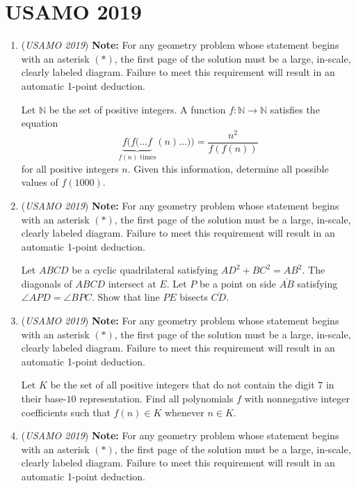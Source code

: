 \section{USAMO 2019}
        \begin{enumerate}
        	\item (\textit{USAMO 2019}) \textbf{Note:} For any geometry problem whose statement begins with an asterisk $(*)$, the first page of the solution must be a large, in-scale, clearly labeled diagram. Failure to meet this requirement will result in an automatic 1-point deduction.


 Let $\mathbb{N}$ be the set of positive integers. A function $f:\mathbb{N}\to\mathbb{N}$ satisfies the equation 
 \[\underbrace{f(f(\ldots f}_{f(n)\text{ times}}(n)\ldots))=\frac{n^2}{f(f(n))}\]for all positive integers $n$. Given this information, determine all possible values of $f(1000)$.


 

	\item (\textit{USAMO 2019}) \textbf{Note:} For any geometry problem whose statement begins with an asterisk $(*)$, the first page of the solution must be a large, in-scale, clearly labeled diagram. Failure to meet this requirement will result in an automatic 1-point deduction.


 Let $ABCD$ be a cyclic quadrilateral satisfying $AD^2 + BC^2 = AB^2$. The diagonals of $ABCD$ intersect at $E$. Let $P$ be a point on side $\overline{AB}$ satisfying $\angle APD = \angle BPC$. Show that line $PE$ bisects $\overline{CD}$.


 

	\item (\textit{USAMO 2019}) \textbf{Note:} For any geometry problem whose statement begins with an asterisk $(*)$, the first page of the solution must be a large, in-scale, clearly labeled diagram. Failure to meet this requirement will result in an automatic 1-point deduction.


 Let $K$ be the set of all positive integers that do not contain the digit $7$ in their base-$10$ representation. Find all polynomials $f$ with nonnegative integer coefficients such that $f(n)\in K$ whenever $n\in K$.


 



 

	\item (\textit{USAMO 2019}) \textbf{Note:} For any geometry problem whose statement begins with an asterisk $(*)$, the first page of the solution must be a large, in-scale, clearly labeled diagram. Failure to meet this requirement will result in an automatic 1-point deduction.



\end{enumerate}
